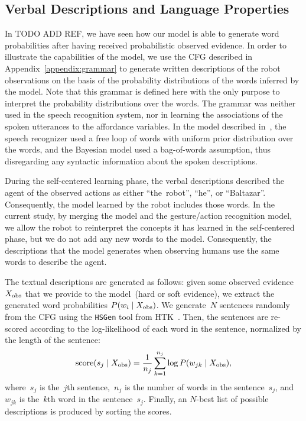 \subsection{Verbal Descriptions and Language Properties}

In TODO ADD REF, we have seen how our model is able to generate word probabilities after having received probabilistic observed evidence.
In order to illustrate the capabilities of the model, we use the \ac{CFG} described in Appendix~\ref{appendix:grammar} to generate written descriptions of the robot observations on the basis of the probability distributions of the words inferred by the model.
Note that this grammar is defined here with the only purpose to interpret the probability distributions over the words.
The grammar was neither used in the speech recognition system, nor in learning the associations of the spoken utterances to the affordance variables.
In the model described in~\cite{salvi:2012:smcb}, the speech recognizer used a free loop of words with uniform prior distribution over the words, and the Bayesian model used a bag-of-words assumption, thus disregarding any syntactic information about the spoken descriptions.

During the self-centered learning phase, the verbal descriptions described the agent of the observed actions as either ``the~robot'', ``he'', or ``Baltazar''.
Consequently, the \AffWords{} model learned by the robot includes those words.
In the current study, by merging the \AffWords{} model and the gesture/action recognition model, we allow the robot to reinterpret the concepts it has learned in the self-centered phase, but we do not add any new words to the model.
Consequently, the descriptions that the model generates when observing humans use the same words to describe the agent.

The textual descriptions are generated as follows: given some observed evidence~$X_\text{obs}$ that we provide to the model~(hard or soft evidence), we extract the generated word probabilities
$P(w_i \mid X_\text{obs})$.
We generate~$N$ sentences randomly from the \ac{CFG} using the \texttt{HSGen} tool from HTK~\cite{young:htkbook}.
Then, the sentences are re-scored according to the log-likelihood of each word in the sentence, normalized by the length of the sentence:
\begin{equation} \label{eq:sentence_score}
  \text{score}(s_j \given \xobs) = \frac{1}{n_j} \sum_{k=1}^{n_j} \log P(w_{jk} \given \xobs),
\end{equation}
where~$s_j$ is the~$j$th sentence,~$n_j$ is the number of words in the sentence~$s_j$, and~$w_{jk}$ is the~$k$th word in the sentence~$s_j$.
Finally, an $N$-best list of possible descriptions is produced by sorting the scores.

